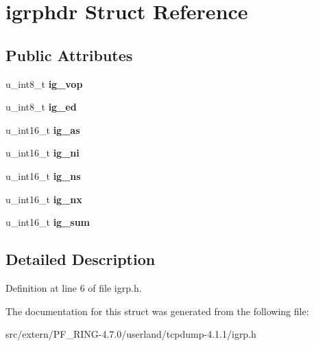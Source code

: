 \hypertarget{structigrphdr}{
\section{igrphdr Struct Reference}
\label{structigrphdr}
}
\subsection*{Public Attributes}
\begin{DoxyCompactItemize}
\item 
\hypertarget{structigrphdr_adb44ddc5982e6ce742a462e99fd2b467}{
u\_\-int8\_\-t {\bfseries ig\_\-vop}}
\label{structigrphdr_adb44ddc5982e6ce742a462e99fd2b467}

\item 
\hypertarget{structigrphdr_aa4b4c27775abfeb31ff034b65c21cf80}{
u\_\-int8\_\-t {\bfseries ig\_\-ed}}
\label{structigrphdr_aa4b4c27775abfeb31ff034b65c21cf80}

\item 
\hypertarget{structigrphdr_a4e467dccb580dc5d73a69ffaaef8bf98}{
u\_\-int16\_\-t {\bfseries ig\_\-as}}
\label{structigrphdr_a4e467dccb580dc5d73a69ffaaef8bf98}

\item 
\hypertarget{structigrphdr_af1cbf990522993f61499966c9e444676}{
u\_\-int16\_\-t {\bfseries ig\_\-ni}}
\label{structigrphdr_af1cbf990522993f61499966c9e444676}

\item 
\hypertarget{structigrphdr_a738c52fe02ed5f4e2ef7221f054f6652}{
u\_\-int16\_\-t {\bfseries ig\_\-ns}}
\label{structigrphdr_a738c52fe02ed5f4e2ef7221f054f6652}

\item 
\hypertarget{structigrphdr_a248617191174f0f7277c55612728ed16}{
u\_\-int16\_\-t {\bfseries ig\_\-nx}}
\label{structigrphdr_a248617191174f0f7277c55612728ed16}

\item 
\hypertarget{structigrphdr_a4b7c624b789512c8e1573b63038a14ed}{
u\_\-int16\_\-t {\bfseries ig\_\-sum}}
\label{structigrphdr_a4b7c624b789512c8e1573b63038a14ed}

\end{DoxyCompactItemize}


\subsection{Detailed Description}


Definition at line 6 of file igrp.h.



The documentation for this struct was generated from the following file:\begin{DoxyCompactItemize}
\item 
src/extern/PF\_\-RING-\/4.7.0/userland/tcpdump-\/4.1.1/igrp.h\end{DoxyCompactItemize}
